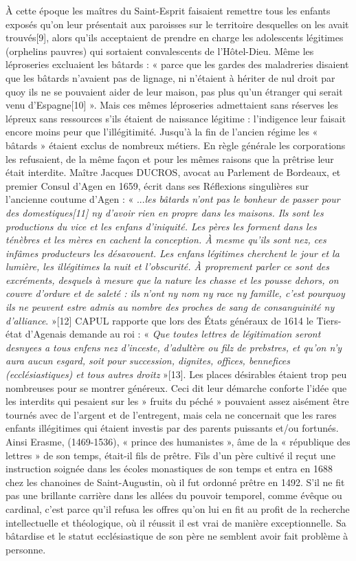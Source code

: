  À cette époque les maîtres du Saint-Esprit faisaient remettre tous les enfants exposés qu'on leur présentait aux paroisses sur le territoire desquelles on les avait trouvés[9], alors qu'ils acceptaient de prendre en charge les adolescents légitimes (orphelins pauvres) qui sortaient convalescents de l'Hôtel-Dieu. 
 Même les léproseries excluaient les bâtards : « parce que les gardes des maladreries disaient que les bâtards n'avaient pas de lignage, ni n'étaient à hériter de nul droit par quoy ils ne se pouvaient aider de leur maison, pas plus qu'un étranger qui serait venu d'Espagne[10] ». Mais ces mêmes léproseries admettaient sans réserves les lépreux sans ressources s'ils étaient de naissance légitime : l'indigence leur faisait encore moins peur que l'illégitimité.
 Jusqu'à la fin de l'ancien régime les « bâtards » étaient exclus de nombreux métiers. En règle générale les corporations les refusaient, de la même façon et pour les mêmes raisons que la prêtrise leur était interdite. Maître Jacques DUCROS, avocat au Parlement de Bordeaux, et premier Consul d'Agen en 1659, écrit dans ses Réflexions singulières sur l'ancienne coutume d'Agen : « ...\emph{les bâtards n'ont pas le bonheur de passer pour des domestiques[11] ny d'avoir rien en propre dans les maisons. Ils sont les productions du vice et les enfans d'iniquité. Les pères les forment dans les ténèbres et les mères en cachent la conception. À mesme qu'ils sont nez, ces infâmes producteurs les désavouent. Les enfans légitimes cherchent le jour et la lumière, les illégitimes la nuit et l'obscurité. À proprement parler ce sont des excréments, desquels à mesure que la nature les chasse et les pousse dehors, on couvre d'ordure et de saleté : ils n'ont ny nom ny race ny famille, c'est pourquoy ils ne peuvent estre admis au nombre des proches de sang de consanguinité ny d'alliance}. »[12]
 CAPUL rapporte que lors des États généraux de 1614 le Tiers-état d'Agenais demande au roi : « \emph{Que toutes lettres de légitimation seront desnyees a tous enfens nez d'inceste, d'adultère ou filz de prebstres, et qu'on n'y aura aucun esgard, soit pour succession, dignites, offices, bennefices (ecclésiastiques) et tous autres droitz} »[13]. Les places désirables étaient trop peu nombreuses pour se montrer généreux. Ceci dit leur démarche conforte l'idée que les interdits qui pesaient sur les » fruits du péché » pouvaient assez aisément être tournés avec de l'argent et de l'entregent, mais cela ne concernait que les rares enfants illégitimes qui étaient investis par des parents puissants et/ou fortunés. 
 Ainsi Erasme, (1469-1536), « prince des humanistes », âme de la « république des lettres » de son temps, était-il fils de prêtre. Fils d'un père cultivé il reçut une instruction soignée dans les écoles monastiques de son temps et entra en 1688 chez les chanoines de Saint-Augustin, où il fut ordonné prêtre en 1492. S'il ne fit pas une brillante carrière dans les allées du pouvoir temporel, comme évêque ou cardinal, c'est parce qu'il refusa les offres qu'on lui en fit au profit de la recherche intellectuelle et théologique, où il réussit il est vrai de manière exceptionnelle. Sa bâtardise et le statut ecclésiastique de son père ne semblent avoir fait problème à personne. 
